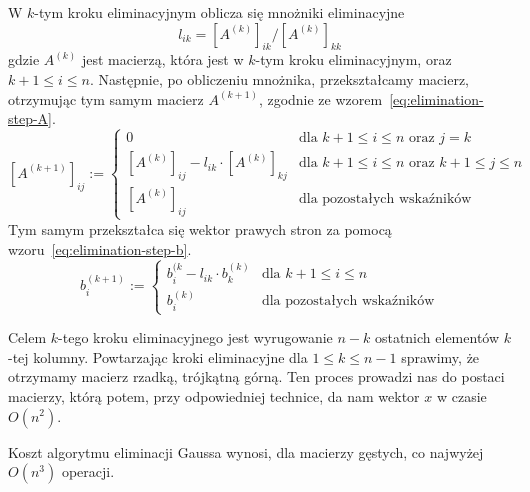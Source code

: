 \documentclass[../main.tex]{subfiles}
\begin{document}
    W \( k \)-tym kroku eliminacyjnym oblicza się mnożniki eliminacyjne
    \[ l_{ik} = [A^{(k)}]_{ik}/[A^{(k)}]_{kk} \] gdzie \( A^{(k)} \)
    jest macierzą, która jest w \( k \)-tym kroku eliminacyjnym,
    oraz \( k + 1 \le i \le n \).
    Następnie, po obliczeniu mnożnika, przekształcamy macierz,
    otrzymując tym samym macierz \( A^{(k + 1)} \), zgodnie
    ze wzorem~\ref{eq:elimination-step-A}.
    \begin{equation} \label{eq:elimination-step-A}
      [A^{(k + 1)}]_{ij} := \begin{cases}
        0 & \text{dla $k + 1 \le i \le n$ oraz $j = k$} \\
        [A^{(k)}]_{ij} - l_{ik} \cdot [A^{(k)}]_{kj} & \text{dla $k + 1 \le i \le n$ oraz $k + 1 \le
        j \le n$} \\
        [A^{(k)}]_{ij} & \text{dla pozostałych wskaźników}
      \end{cases}
    \end{equation}
    Tym samym przekształca się wektor prawych stron za pomocą wzoru~\ref{eq:elimination-step-b}.
    \begin{equation} \label{eq:elimination-step-b}
      b^{(k + 1)}_i := \begin{cases}
        b^{(k}_i - l_{ik} \cdot b^{(k)}_k & \text{dla $k + 1 \le i \le n$} \\
        b^{(k)}_i & \text{dla pozostałych wskaźników}
      \end{cases}
    \end{equation}

    Celem \( k \)-tego kroku eliminacyjnego jest wyrugowanie \( n - k \) ostatnich elementów
    \( k \)-tej kolumny. Powtarzając kroki eliminacyjne dla \( 1 \le k \le n-1 \) 
    sprawimy, że otrzymamy macierz rzadką, trójkątną górną.
    Ten proces prowadzi nas do postaci macierzy, którą potem, przy odpowiedniej
    technice, da nam wektor \( x \) w czasie \( O(n^2) \).

    Koszt algorytmu eliminacji Gaussa wynosi, dla macierzy gęstych, co najwyżej \( O(n^3) \)
    operacji.
\end{document}

